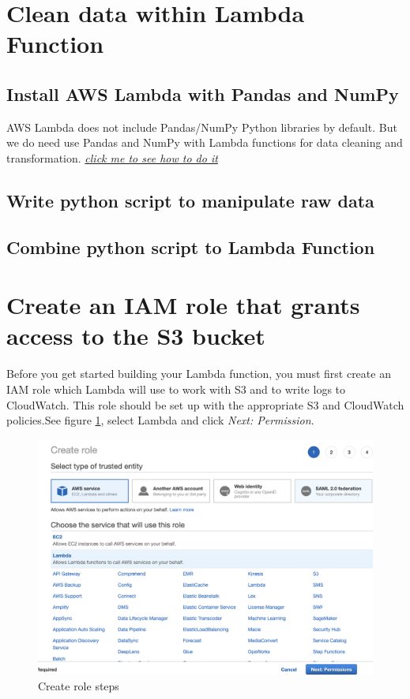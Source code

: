 \documentclass[12pt]{article}
\begin{document}
\newpage
\section{Clean data within Lambda Function}
\subsection{Install AWS Lambda with Pandas and NumPy}
AWS Lambda does not include Pandas/NumPy Python libraries by default. But we do need use Pandas and NumPy with Lambda functions for data cleaning and transformation. \href{https://medium.com/@korniichuk/lambda-with-pandas-fd81aa2ff25e}{\textit{click me to see how to do it}}

\subsection{Write python script to manipulate raw data}

\subsection{Combine python script to Lambda Function}



\newpage
\section{Create an IAM role that grants access to the S3 bucket}

Before you get started building your Lambda function, you must first create an IAM role which Lambda will use to work with S3 and to write logs to CloudWatch. This role should be set up with the appropriate S3 and CloudWatch policies.See figure \ref{fig:create_role}, select Lambda and click \textit{Next: Permission}.
\begin{figure}[H]
\centering
\begin{minipage}{1\textwidth}
  \centering
  \includegraphics[width=1\linewidth]{create_role.png}
   \caption{Create role steps}
   \label{fig:create_role}
\end{minipage}%
\end{figure}
\end{document}

